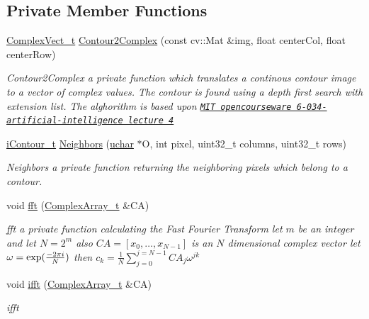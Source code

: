 \subsection*{Private Member Functions}
\begin{DoxyCompactItemize}
\item 
\hyperlink{_soil_math_types_8h_a7567e521c2b2c408dcb62dbff72390f7}{Complex\+Vect\+\_\+t} \hyperlink{class_soil_math_1_1_f_f_t_a18a95490ea8e929584c2af6569dec3b6}{Contour2\+Complex} (const cv\+::\+Mat \&img, float center\+Col, float center\+Row)
\begin{DoxyCompactList}\small\item\em Contour2\+Complex a private function which translates a continous contour image to a vector of complex values. The contour is found using a depth first search with extension list. The alghorithm is based upon \href{http://ocw.mit.edu/courses/electrical-engineering-and-computer-science/6-034-artificial-intelligence-fall-2010/lecture-videos/lecture-4-search-depth-first-hill-climbing-beam/}{\tt M\+I\+T opencourseware 6-\/034-\/artificial-\/intelligence lecture 4} \end{DoxyCompactList}\item 
\hyperlink{_soil_math_types_8h_a1ade796add2f13888dfa9e6bde0bdc37}{i\+Contour\+\_\+t} \hyperlink{class_soil_math_1_1_f_f_t_a45b32ad009154112d2fc4e467fc7c5ac}{Neighbors} (\hyperlink{_soil_math_types_8h_a65f85814a8290f9797005d3b28e7e5fc}{uchar} $\ast$O, int pixel, uint32\+\_\+t columns, uint32\+\_\+t rows)
\begin{DoxyCompactList}\small\item\em Neighbors a private function returning the neighboring pixels which belong to a contour. \end{DoxyCompactList}\item 
void \hyperlink{class_soil_math_1_1_f_f_t_a48bc7ad948d820d6f87b3e353b6d1cd4}{fft} (\hyperlink{_soil_math_types_8h_a5118c9f6b02a06945c93a3893e51febe}{Complex\+Array\+\_\+t} \&C\+A)
\begin{DoxyCompactList}\small\item\em fft a private function calculating the Fast Fourier Transform let $ m $ be an integer and let $ N=2^m $ also $ CA=[x_0,\ldots,x_{N-1}] $ is an $ N $ dimensional complex vector let $ \omega=\exp({-2\pi i\over N}) $ then $ c_k={\frac{1}{N}}\sum_{j=0}^{j=N-1}CA_j\omega^{jk} $ \end{DoxyCompactList}\item 
void \hyperlink{class_soil_math_1_1_f_f_t_a5b7f18d1cb2d728584414d8660d52586}{ifft} (\hyperlink{_soil_math_types_8h_a5118c9f6b02a06945c93a3893e51febe}{Complex\+Array\+\_\+t} \&C\+A)
\begin{DoxyCompactList}\small\item\em ifft \end{DoxyCompactList}\end{DoxyCompactItemize}
